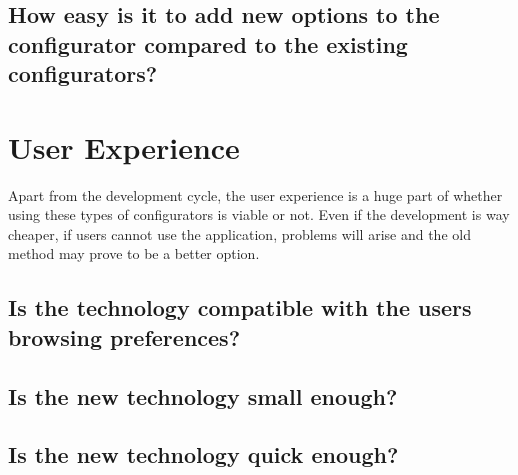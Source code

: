 \subsection{How easy is it to add new options to the configurator compared to the existing configurators?}

\section{User Experience}
Apart from the development cycle, the user experience is a huge part of whether using these types of configurators is viable or not. Even if the development is way cheaper, if users cannot use the application, problems will arise and the old method may prove to be a better option.

\subsection{Is the technology compatible with the users browsing preferences?}

\subsection{Is the new technology small enough?}

\subsection{Is the new technology quick enough?}
